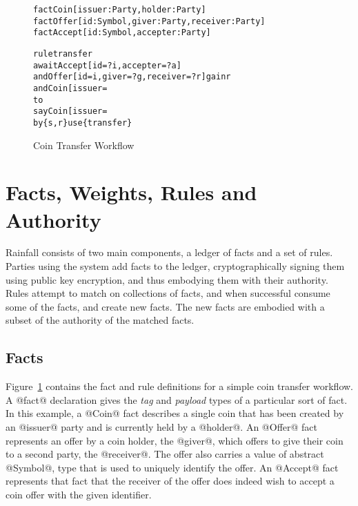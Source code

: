 
\clearpage{}


\begin{figure}
\begin{small}
\begin{alltt}
fact  Coin   [issuer: Party, holder: Party]
fact  Offer  [id: Symbol, giver: Party, receiver: Party]
fact  Accept [id: Symbol, accepter: Party]

rule  transfer
await Accept [id = ?i, accepter = ?a]
  and Offer  [id = i,  giver = ?g, receiver = ?r] gain r
  and Coin   [issuer = %Ivan, holder = g] gain s
to
  say Coin   [issuer = %Ivan, holder = r]
   by \{s, r\} use \{transfer\}
\end{alltt}
\end{small}
\caption{Coin Transfer Workflow}
\label{f:CoinTransfer}
\end{figure}


\section{Facts, Weights, Rules and Authority}
Rainfall consists of two main components, a ledger of facts and a set of rules. Parties using the system add facts to the ledger, cryptographically signing them using public key encryption, and thus embodying them with their authority. Rules attempt to match on collections of facts, and when successful consume some of the facts, and create new facts. The new facts are embodied with a subset of the authority of the matched facts.


\subsection{Facts}
\label{s:Facts}
Figure~\ref{f:CoinTransfer} contains the fact and rule definitions for a simple coin transfer workflow. A @fact@ declaration gives the \emph{tag} and \emph{payload} types of a particular sort of fact. In this example, a @Coin@ fact describes a single coin that has been created by an @issuer@ party and is currently held by a @holder@. An @Offer@ fact represents an offer by a coin holder, the @giver@, which offers to give their coin to a second party, the @receiver@. The offer also carries a value of abstract @Symbol@, type that is used to uniquely identify the offer. An @Accept@ fact represents that fact that the receiver of the offer does indeed wish to accept a coin offer with the given identifier.

